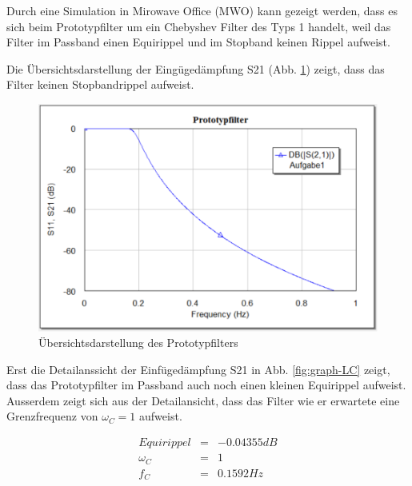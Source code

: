 Durch eine Simulation in Mirowave Office (MWO) kann gezeigt werden, dass es sich beim Prototypfilter um ein Chebyshev Filter des Typs 1 handelt, weil das Filter im Passband einen Equirippel und im Stopband keinen Rippel aufweist. 

Die Übersichtsdarstellung der Eingügedämpfung S21 (Abb. \ref{fig:Ovw_Prototyp}) zeigt, dass das Filter keinen Stopbandrippel aufweist.

\begin{figure}[h!]
    \centering
 	\includegraphics[width=\imagewidth]{images/Ovw_Prototyp.png}
 	\caption{Übersichtsdarstellung des Prototypfilters}
 	\label{fig:Ovw_Prototyp}
\end{figure}

Erst die Detailanssicht der  Einfügedämpfung  S21  in  Abb. \ref{fig:graph-LC}
zeigt, dass das Prototypfilter im  Passband auch noch einen kleinen Equirippel
aufweist. Ausserdem zeigt  sich  aus der Detailansicht, dass das Filter wie er
erwartete eine Grenzfrequenz von $\omega_C = 1$ aufweist.

\begin{mdframed}
    \begin{equation*} 
        \begin{array}{rclcl} 
            Equirippel & = & -0.04355 dB \\ 
            \omega_C & = & 1 \\ 
            f_C & = & 0.1592 Hz \\ 
        \end{array} 
    \end{equation*} 
\end{mdframed}

